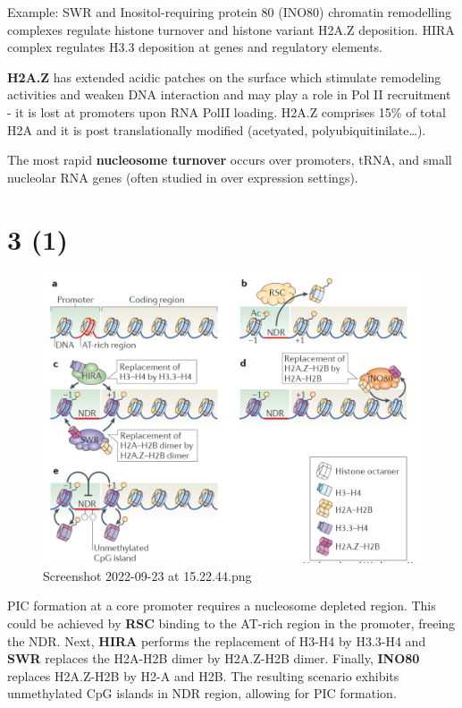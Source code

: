Example: SWR and Inositol-requiring protein 80 (INO80) chromatin remodelling complexes regulate histone turnover and histone variant H2A.Z deposition. HIRA complex regulates H3.3 deposition at genes and regulatory elements.

\textbf{H2A.Z} has extended acidic patches on the surface which stimulate remodeling activities and weaken DNA interaction and may play a role in Pol II recruitment - it is lost at promoters upon RNA PolII loading. H2A.Z comprises 15\% of total H2A and it is post translationally modified (acetyated, polyubiquitinilate\ldots).

The most rapid \textbf{nucleosome turnover} occurs over promoters, tRNA, and small nucleolar RNA genes (often studied in over expression settings).

\hypertarget{section}{%
\section{3 (1)}\label{section}}

\begin{figure}
\centering
\includegraphics[width=\textwidth]{../_resources/Screenshot_2022-09-23_at_15-22-44.png}
\caption{Screenshot 2022-09-23 at 15.22.44.png}
\end{figure}

PIC formation at a core promoter requires a nucleosome depleted region. This could be achieved by \textbf{RSC} binding to the AT-rich region in the promoter, freeing the NDR. Next, \textbf{HIRA} performs the replacement of H3-H4 by H3.3-H4 and \textbf{SWR} replaces the H2A-H2B dimer by H2A.Z-H2B dimer. Finally, \textbf{INO80} replaces H2A.Z-H2B by H2-A and H2B. The resulting scenario exhibits unmethylated CpG islands in NDR region, allowing for PIC formation.

